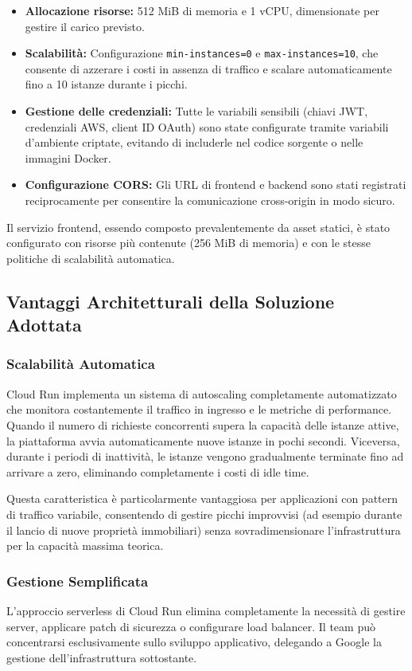 \begin{itemize}
    \item \textbf{Allocazione risorse:} 512 MiB di memoria e 1 vCPU, dimensionate per gestire il carico previsto.
    \item \textbf{Scalabilità:} Configurazione \texttt{min-instances=0} e \texttt{max-instances=10}, che consente di azzerare i costi in assenza di traffico e scalare automaticamente fino a 10 istanze durante i picchi.
    \item \textbf{Gestione delle credenziali:} Tutte le variabili sensibili (chiavi JWT, credenziali AWS, client ID OAuth) sono state configurate tramite variabili d'ambiente criptate, evitando di includerle nel codice sorgente o nelle immagini Docker.
    \item \textbf{Configurazione CORS:} Gli URL di frontend e backend sono stati registrati reciprocamente per consentire la comunicazione cross-origin in modo sicuro.
\end{itemize}

Il servizio frontend, essendo composto prevalentemente da asset statici, è stato configurato con risorse più contenute (256 MiB di memoria) e con le stesse politiche di scalabilità automatica.

\subsection{Vantaggi Architetturali della Soluzione Adottata}

\subsubsection{Scalabilità Automatica}
Cloud Run implementa un sistema di autoscaling completamente automatizzato che monitora costantemente il traffico in ingresso e le metriche di performance. Quando il numero di richieste concorrenti supera la capacità delle istanze attive, la piattaforma avvia automaticamente nuove istanze in pochi secondi. Viceversa, durante i periodi di inattività, le istanze vengono gradualmente terminate fino ad arrivare a zero, eliminando completamente i costi di idle time.

Questa caratteristica è particolarmente vantaggiosa per applicazioni con pattern di traffico variabile, consentendo di gestire picchi improvvisi (ad esempio durante il lancio di nuove proprietà immobiliari) senza sovradimensionare l'infrastruttura per la capacità massima teorica.

\subsubsection{Gestione Semplificata}
L'approccio serverless di Cloud Run elimina completamente la necessità di gestire server, applicare patch di sicurezza o configurare load balancer. Il team può concentrarsi esclusivamente sullo sviluppo applicativo, delegando a Google la gestione dell'infrastruttura sottostante.

